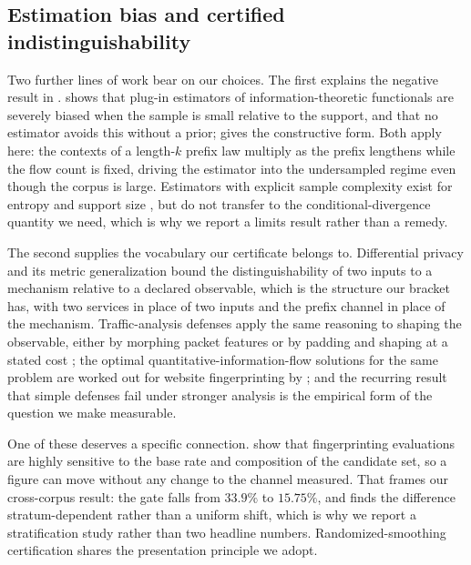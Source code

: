 \subsection{Estimation bias and certified indistinguishability}
\label{sec:related/growth}

Two further lines of work bear on our choices. The first explains the negative
result in . \citet{paninski2003entropy} shows that
plug-in estimators of information-theoretic functionals are severely biased when
the sample is small relative to the support, and that no estimator avoids this
without a prior; \citet{nemenman2002entropy} gives the constructive form. Both
apply here: the contexts of a length-$k$ prefix law multiply as the prefix
lengthens while the flow count is fixed, driving the estimator into the
undersampled regime even though the corpus is large. Estimators with explicit
sample complexity exist for entropy and support size
\citep{valiant2011estimating}, but do not transfer to the conditional-divergence
quantity we need, which is why we report a limits result rather than a remedy.

The second supplies the vocabulary our certificate belongs to. Differential
privacy \citep{dwork2006differential} and its metric generalization
\citep{andres2013geo} bound the distinguishability of two inputs to a mechanism
relative to a declared observable, which is the structure our bracket has, with
two services in place of two inputs and the prefix channel in place of the
mechanism. Traffic-analysis defenses apply the same reasoning to shaping the
observable, either by morphing packet features \citep{wright2009traffic} or by
padding and shaping at a stated cost \citep{cai2014systematic}; the optimal
quantitative-information-flow solutions for the same problem are worked out for
website fingerprinting by \citep{athanasiou2025selfdefense}; and the recurring
result that simple defenses fail under stronger analysis
\citep{dyer2012peekaboo} is the empirical form of the question we make
measurable.

One of these deserves a specific connection. \citet{juarez2014critical} show
that fingerprinting evaluations are highly sensitive to the base rate and
composition of the candidate set, so a figure can move without any change to the
channel measured. That frames our cross-corpus result: the gate falls from
$33.9\%$ to $15.75\%$, and  finds the
difference stratum-dependent rather than a uniform shift, which is why we report a
stratification study rather than two headline numbers. Randomized-smoothing
certification \citep{cohen2019certified} shares the presentation principle we
adopt.

